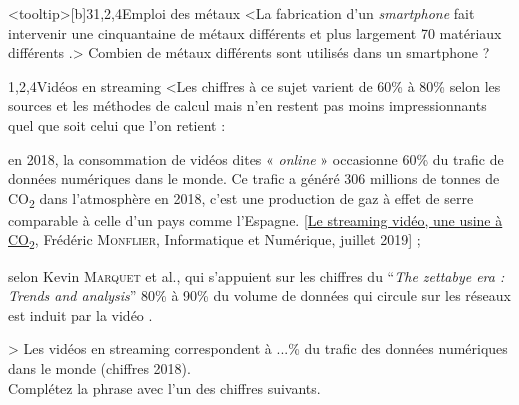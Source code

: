 \begin{quiz}[title={Numérique et environnement}]
\begin{quizquestion*}<tooltip>[b]{3}{1,2,4}{Emploi des métaux}
<La fabrication d’un \textit{smartphone} fait intervenir une cinquantaine de métaux différents et plus largement 70 matériaux différents \parencite{Marquet-et-al:2019}.>
Combien de métaux différents sont utilisés dans un smartphone ?
\end{quizquestion*}

\begin{quizquestion*}[b]{3}{1,2,4}{Vidéos en streaming}
<Les chiffres à ce sujet varient de 60\% à 80\% selon les sources et les méthodes de calcul mais n'en restent pas moins impressionnants quel que soit celui que l'on retient :
\begin{jazzitemize}
\item en 2018, la consommation de vidéos dites « \textit{online} » occasionne 60\% du trafic de données numériques dans le monde. Ce trafic a généré 306 millions de tonnes de CO\textsubscript{2} dans l’atmosphère en 2018, c’est une production de gaz à effet de serre comparable à celle d’un pays comme l’Espagne. [\href{https://www.techniques-ingenieur.fr/actualite/articles/le-streaming-video-une-usine-a-co2-68488/}{Le streaming vidéo, une usine à CO\textsubscript{2}}, Frédéric \textsc{Monflier}, Informatique et Numérique, juillet 2019] ;
\item selon Kevin \textsc{Marquet} et al., qui s'appuient sur les chiffres du “\textit{The zettabye era : Trends and analysis}” 80\% à 90\% du volume de données qui circule sur les réseaux est induit par la vidéo \parencite{Marquet-et-al:2019}.
\end{jazzitemize}>
Les vidéos en streaming correspondent à ...\% du trafic des données numériques dans le monde (chiffres 2018).\\
Complétez la phrase avec l'un des chiffres suivants.
\end{quizquestion*}


\end{quiz}
